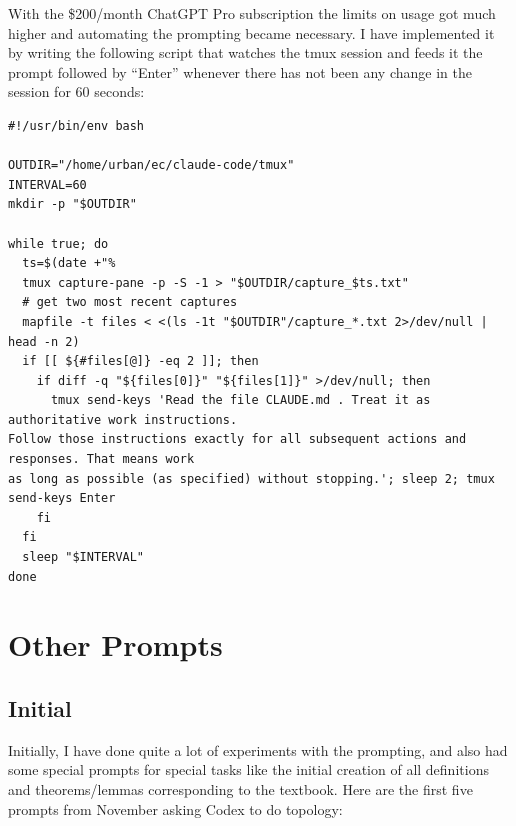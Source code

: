 \documentclass[a4paper,UKenglish,cleveref, autoref, thm-restate]{lipics-v2021}
\begin{document}
With the \$200/month ChatGPT Pro subscription the limits on usage got much higher and automating the prompting became necessary. I have implemented it by writing the following script that watches the tmux session and feeds it the prompt followed by ``Enter'' whenever there has not been any change in the session for 60 seconds:

\begin{small}
\begin{verbatim}
#!/usr/bin/env bash

OUTDIR="/home/urban/ec/claude-code/tmux"
INTERVAL=60
mkdir -p "$OUTDIR"

while true; do
  ts=$(date +"%
  tmux capture-pane -p -S -1 > "$OUTDIR/capture_$ts.txt"
  # get two most recent captures
  mapfile -t files < <(ls -1t "$OUTDIR"/capture_*.txt 2>/dev/null | head -n 2)
  if [[ ${#files[@]} -eq 2 ]]; then
    if diff -q "${files[0]}" "${files[1]}" >/dev/null; then
      tmux send-keys 'Read the file CLAUDE.md . Treat it as authoritative work instructions.
Follow those instructions exactly for all subsequent actions and responses. That means work
as long as possible (as specified) without stopping.'; sleep 2; tmux send-keys Enter
    fi
  fi
  sleep "$INTERVAL"
done
\end{verbatim}
\end{small}  

\section{Other Prompts}

\subsection{Initial}
Initially, I have done quite a lot of experiments with the prompting, and also
had some special prompts for special tasks like the initial creation of all
definitions and theorems/lemmas corresponding to the textbook.
Here are the first five prompts from November asking Codex to do topology:\\
\end{document}
